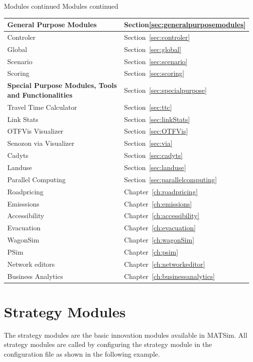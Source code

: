 \createtable%
{Modules continued}%
{Modules continued}%
{\label{tab:modulescontinued}}%
{%
  \begin{tabular}[c]{|l|l|}
	\hline
	\textbf{General Purpose Modules} & Section\ref{sec:generalpurposemodules} \\
	\hline
	Controler & Section~\ref{sec:controler} \\
	Global & Section~\ref{sec:global} \\
	Scenario & Section~\ref{sec:scenario} \\
	Scoring & Section~\ref{sec:scoring} \\
	\hline
	\textbf{Special Purpose Modules, Tools and Functionalities} & Section~\ref{sec:specialpurpose} \\
	\hline
	Travel Time Calculator & Section~\ref{sec:ttc} \\
	Link Stats & Section~\ref{sec:linkStats} \\
	OTFVis Visualizer & Section~\ref{sec:OTFVis} \\
	Senozon via Visualizer & Section~\ref{sec:via} \\
	Cadyts & Section~\ref{sec:cadyts} \\
	Landuse & Section~\ref{sec:landuse} \\
	Parallel Computing & Section~\ref{sec:parallelcomputing} \\
	Roadpricing & Chapter~\ref{ch:roadpricing} \\
	Emisssions & Chapter~\ref{ch:emissions} \\
	Accessibility & Chapter~\ref{ch:accessibility} \\
	Evacuation & Chapter~\ref{ch:evacuation}  \\
	WagonSim & Chapter~\ref{ch:wagonSim} \\
	PSim & Chapter~\ref{ch:psim} \\
	Network editors &  Chapter~\ref{ch:networkeditor} \\
	Business Analytics & Chapter~\ref{ch:businessanalytics} \\
	\hline
	\end{tabular}
}%
{}

\section{Strategy Modules}
\label{sec:strategymodules}
The strategy modules are the basic innovation modules available in MATSim. All strategy modules are called by configuring the strategy module in the configuration file as shown in the following example.


